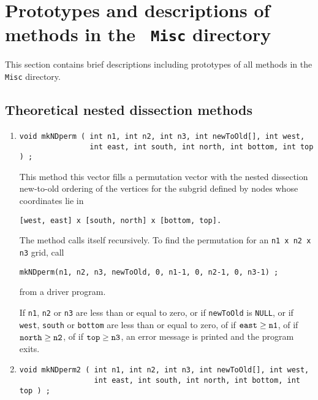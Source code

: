 \par
\section{Prototypes and descriptions of methods in the {\tt
Misc} directory}
\label{section:Misc:proto}
\par
This section contains brief descriptions including prototypes
of all methods in the {\tt Misc} directory.
\par
\subsection{Theoretical nested dissection methods}
\begin{enumerate}
\item
\begin{verbatim}
void mkNDperm ( int n1, int n2, int n3, int newToOld[], int west, 
                int east, int south, int north, int bottom, int top ) ;
\end{verbatim}
This method this vector fills a permutation vector with the
nested dissection
new-to-old ordering of the vertices for the subgrid defined by
nodes whose coordinates lie in
\begin{verbatim}
[west, east] x [south, north] x [bottom, top].
\end{verbatim}
The method calls itself recursively.
To find the permutation for an {\tt n1 x n2 x n3} grid, call
\begin{verbatim}
mkNDperm(n1, n2, n3, newToOld, 0, n1-1, 0, n2-1, 0, n3-1) ;
\end{verbatim}
from a driver program.
\par {}
If {\tt n1}, {\tt n2} or {\tt n3} are less than or equal to zero,
or if {\tt newToOld} is {\tt NULL},
or if {\tt west}, {\tt south} or {\tt bottom} 
are less than or equal to zero,
of if ${\tt east} \ge {\tt n1}$,
of if ${\tt north} \ge {\tt n2}$,
of if ${\tt top} \ge {\tt n3}$,
an error message is printed and the program exits.
\item
\begin{verbatim}
void mkNDperm2 ( int n1, int n2, int n3, int newToOld[], int west, 
                 int east, int south, int north, int bottom, int top ) ;

\end{verbatim}
\end{enumerate}
